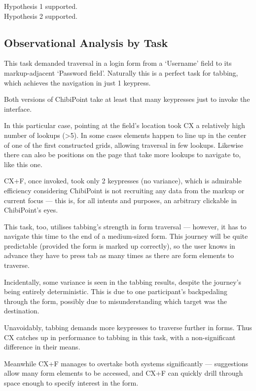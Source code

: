 \documentclass[11pt,openright,a4paper]{report}
\begin{document}
Hypothesis 1 supported.\\
Hypothesis 2 supported.

%
%
%
%
%

\subsection{Observational Analysis by Task}
\label{sec:efficiencydiscussion}
\setcounter{TaskType}{0}
This task demanded traversal in a login form from a `Username' field to its markup-adjacent `Password field'. Naturally this is a perfect task for tabbing, which achieves the navigation in just 1 keypress.

Both versions of ChibiPoint take at least that many keypresses just to invoke the interface.

In this particular case, pointing at the field's location took CX a relatively high number of lookups (>5). In some cases elements happen to line up in the center of one of the first constructed grids, allowing traversal in few lookups. Likewise there can also be positions on the page that take more lookups to navigate to, like this one. 

CX+F, once invoked, took only 2 keypresses (no variance), which is admirable efficiency considering ChibiPoint is not recruiting any data from the markup or current focus --- this is, for all intents and purposes, an arbitrary clickable in ChibiPoint's eyes.

This task, too, utilises tabbing's strength in form traversal --- however, it has to navigate this time to the end of a medium-sized form. This journey will be quite predictable (provided the form is marked up correctly), so the user knows in advance they have to press tab as many times as there are form elements to traverse.

Incidentally, some variance is seen in the tabbing results, despite the journey's being entirely deterministic. This is due to one participant's backpedaling through the form, possibly due to misunderstanding which target was the destination.

Unavoidably, tabbing demands more keypresses to traverse further in forms. Thus CX catches up in performance to tabbing in this task, with a non-significant difference in their means.

Meanwhile CX+F manages to overtake both systems significantly --- suggestions allow many form elements to be accessed, and CX+F can quickly drill through space enough to specify interest in the form.
\end{document}
